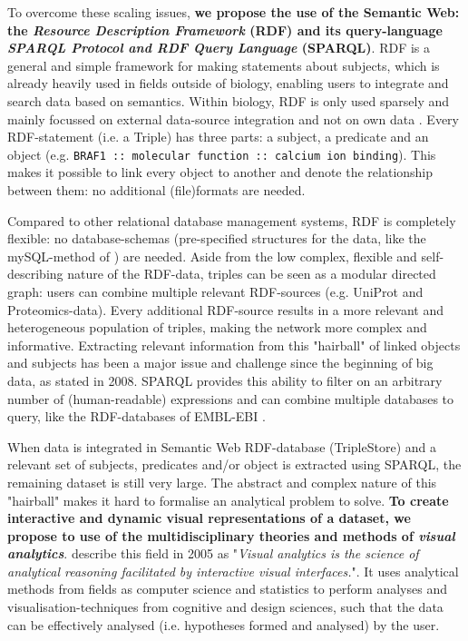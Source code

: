 \documentclass[twoside,fontsize=10pt]{article}
\begin{document}
\noindent
To overcome these scaling issues, \textbf{we propose the use of the Semantic Web: the \textit{Resource Description Framework} (RDF) and its query-language \textit{SPARQL Protocol and RDF Query Language} (SPARQL)}. RDF is a general and simple framework for making statements about subjects, which is already heavily used in fields outside of biology, enabling users to integrate and search data based on semantics. Within biology, RDF is only used sparsely and mainly focussed on external data-source integration and not on own data \cite{Belleau2008,Neumann2006,Sahoo2008}. Every RDF-statement (i.e. a Triple) has three parts: a subject, a predicate and an object (e.g. \lstinline|BRAF1 :: molecular function :: calcium ion binding|). This makes it possible to link every object to another and denote the relationship between them: no additional (file)formats are needed. 

Compared to other relational database management systems, RDF is completely flexible: no database-schemas (pre-specified structures for the data, like the mySQL-method of \citet{Low2013}) are needed. Aside from the low complex, flexible and self-describing nature of the RDF-data, triples can be seen as a modular directed graph: users can combine multiple relevant RDF-sources (e.g. UniProt and Proteomics-data). Every additional RDF-source results in a more relevant and heterogeneous population of triples, making the network more complex and informative. Extracting relevant information from this "hairball" of linked objects and subjects has been a major issue and challenge since the beginning of big data, as \citet{Pavlopoulos2008} stated in 2008. SPARQL provides this ability to filter on an arbitrary number of (human-readable) expressions and can combine multiple databases to query, like the RDF-databases of EMBL-EBI \citep{Jupp2014}. 
\medskip

\noindent
When data is integrated in Semantic Web RDF-database (TripleStore) and a relevant set of subjects, predicates and/or object is extracted using SPARQL, the remaining dataset is still very large. The abstract and complex nature of this "hairball" makes it hard to formalise an analytical problem to solve. \textbf{To create interactive and dynamic visual representations of a dataset, we propose to use of the multidisciplinary theories and methods of \textit{visual analytics}}. \citet{Thomas2005} describe this field in 2005 as "\textit{Visual analytics is the science of analytical reasoning facilitated by interactive visual interfaces.}". It uses analytical methods from fields as computer science and statistics to 
perform analyses and visualisation-techniques from cognitive and design sciences, such that the data can be effectively analysed (i.e. hypotheses formed and analysed) by the user.
\medskip
\end{document}
